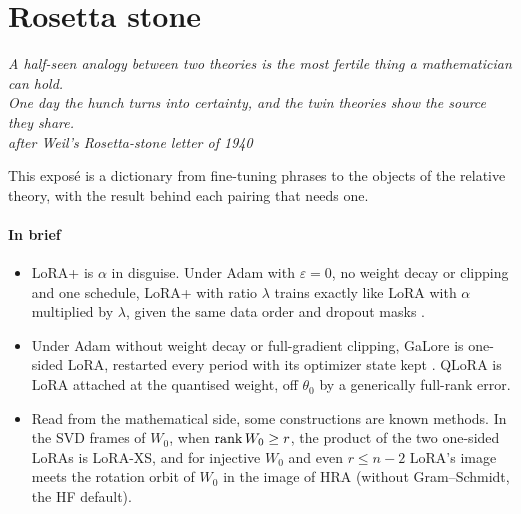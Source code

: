 \section{Rosetta stone}\label{sec:rosetta}

\begin{flushright}
\small\itshape A half-seen analogy between two theories is the most fertile thing a mathematician can hold.\\
One day the hunch turns into certainty, and the twin theories show the source they share.\\[2pt]
{\upshape\footnotesize after Weil's Rosetta-stone letter of 1940}
\end{flushright}

This exposé is a dictionary from fine-tuning phrases to the objects of the relative theory, with the result behind each
pairing that needs one.

\paragraph{In brief}
\begin{itemize}
  \item LoRA+ is $\alpha$ in disguise. Under Adam with $\varepsilon=0$, no weight decay or clipping and one schedule,
    LoRA+ with ratio $\lambda$ trains exactly like LoRA with $\alpha$ multiplied by $\lambda$, given the same data order
    and dropout masks \citep{schulman2025lora}.
  \item Under Adam without weight decay or full-gradient clipping, GaLore is one-sided LoRA, restarted every period with
    its optimizer state kept \citep{xtorrobahennigen2025duality}. QLoRA is LoRA attached at the quantised weight, off
    $\theta_0$ by a generically full-rank error.
  \item Read from the mathematical side, some constructions are known methods. In the SVD frames of $W_0$, when
    $\operatorname{rank} W_0\ge r$, the product of the two one-sided LoRAs is LoRA-XS, and for injective $W_0$ and even $r\le n-2$
    LoRA's image meets the rotation orbit of $W_0$ in the image of HRA (without Gram--Schmidt, the HF default).
\end{itemize}

